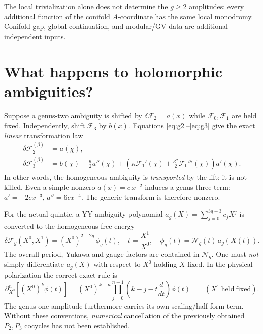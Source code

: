 \documentclass[11pt,letterpaper]{article}
\begin{document}
The local trivialization alone does not determine the $g\geq2$ amplitudes: every additional function of the conifold $A$-coordinate has the same local monodromy. Conifold gap, global continuation, and modular/GV data are additional independent inputs.

\section{What happens to holomorphic ambiguities?}
Suppose a genus-two ambiguity is shifted by $\delta\mathcal F_2=a(x)$ while $\mathcal F_0,\mathcal F_1$ are held fixed. Independently, shift $\mathcal F_3$ by $b(x)$. Equations \eqref{eq:g2}--\eqref{eq:g3} give the exact \emph{linear} transformation law
\begin{equation}
\boxed{\begin{aligned}
\delta\mathcal F_2^{(\beta)}&=a(\chi),\\
\delta\mathcal F_3^{(\beta)}&=b(\chi)+\frac{\kappa}{2}a''(\chi)
+\left(\kappa\mathcal F_1'(\chi)+\frac{\kappa^2}{2}\mathcal F_0'''(\chi)\right)a'(\chi).
\end{aligned}}\label{eq:ambiguity}
\end{equation}
In other words, the homogeneous ambiguity is \emph{transported} by the lift; it is not killed. Even a simple nonzero $a(x)=c\,x^{-2}$ induces a genus-three term: $a'=-2cx^{-3}$, $a''=6cx^{-4}$. The generic transform is therefore nonzero.

For the actual quintic, a YY ambiguity polynomial $a_g(X)=\sum_{j=0}^{3g-3}c_jX^j$ is converted to the homogeneous free energy
\begin{equation}
\delta\mathcal F_g(X^0,X^1)=(X^0)^{2-2g}\,\phi_g(t),\quad
 t=\frac{X^1}{X^0},\quad \phi_g(t)=\mathcal N_g(t)\,a_g(X(t)).
\end{equation}
The overall period, Yukawa and gauge factors are contained in $\mathcal N_g$. One must \emph{not} simply differentiate $a_g(X)$ with respect to $X^0$ holding $X$ fixed. In the physical polarization the correct exact rule is
\begin{equation}
\partial_{X^0}^n[(X^0)^k\phi(t)]
=(X^0)^{k-n}\prod_{j=0}^{n-1}\left(k-j-t\frac{d}{dt}\right)\phi(t)
\qquad(X^1\ \mathrm{held\ fixed}).\label{eq:homogeneous}
\end{equation}
The genus-one amplitude furthermore carries its own scaling/half-form term. Without these conventions, \emph{numerical} cancellation of the previously obtained $P_2,P_3$ cocycles has not been established.
\end{document}
